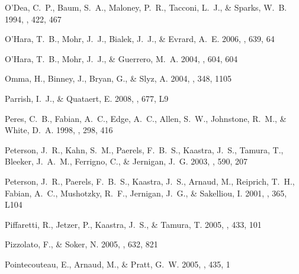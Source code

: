 \documentclass[12pt,preprint]{aastex}
\begin{document}
\begin{thebibliography}{139}
{O'Dea}, C.~P., {Baum}, S.~A., {Maloney}, P.~R., {Tacconi}, L.~J., \& {Sparks},
  W.~B. 1994, \apj, 422, 467

{O'Hara}, T.~B., {Mohr}, J.~J., {Bialek}, J.~J., \& {Evrard}, A.~E. 2006, \apj,
  639, 64

{O'Hara}, T.~B., {Mohr}, J.~J., \& {Guerrero}, M.~A. 2004, \apj, 604, 604

{Omma}, H., {Binney}, J., {Bryan}, G., \& {Slyz}, A. 2004, \mnras, 348, 1105

{Parrish}, I.~J., \& {Quataert}, E. 2008, \apjl, 677, L9

{Peres}, C.~B., {Fabian}, A.~C., {Edge}, A.~C., {Allen}, S.~W., {Johnstone},
  R.~M., \& {White}, D.~A. 1998, \mnras, 298, 416

{Peterson}, J.~R., {Kahn}, S.~M., {Paerels}, F.~B.~S., {Kaastra}, J.~S.,
  {Tamura}, T., {Bleeker}, J.~A.~M., {Ferrigno}, C., \& {Jernigan}, J.~G. 2003,
  \apj, 590, 207

{Peterson}, J.~R., {Paerels}, F.~B.~S., {Kaastra}, J.~S., {Arnaud}, M.,
  {Reiprich}, T.~H., {Fabian}, A.~C., {Mushotzky}, R.~F., {Jernigan}, J.~G., \&
  {Sakelliou}, I. 2001, \aap, 365, L104

{Piffaretti}, R., {Jetzer}, P., {Kaastra}, J.~S., \& {Tamura}, T. 2005, \aap,
  433, 101

{Pizzolato}, F., \& {Soker}, N. 2005, \apj, 632, 821

{Pointecouteau}, E., {Arnaud}, M., \& {Pratt}, G.~W. 2005, \aap, 435, 1


\end{thebibliography}
\end{document}
